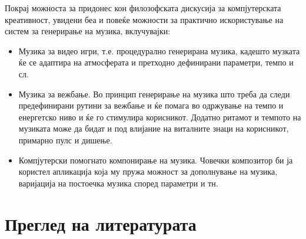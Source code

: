 Покрај можноста за придонес кон филозофската дискусија за компјутерската креативност, увидени беа и повеќе можности за практично искористување на систем за генерирање на музика, вклучувајки:
\begin{itemize}
\item Музика за видео игри, т.е. процедурално генерирана музика, кадешто музката ќе се адаптира на атмосферата и претходно дефинирани параметри, темпо и сл.
\item Музика за вежбање. Во принцип генерирање на музика што треба да следи предефинирани рутини за вежбање и ќе помага во одржување на темпо и енергетско ниво и ќе го стимулира корисникот. Додатно ритамот и темпото на музиката може да бидат и под влијание на виталните знаци на корисникот, примарно пулс и дишење.
\item Компјутерски помогнато компонирање на музика. Човечки композитор би ја користел апликација која му пружа можност за дополнување на музика, варијација на постоечка музика според параметри и тн.
\end{itemize}

\chapter{Преглед на литературата}
\label{ch:pregled}

